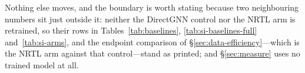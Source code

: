 Nothing else moves, and the boundary is worth stating because
two neighbouring numbers sit just outside it: neither the DirectGNN control nor the NRTL arm is
retrained, so their rows in Tables~\ref{tab:baselines}, \ref{tab:si-baselines-full}
and~\ref{tab:si-arms}, and the endpoint
comparison of \S\ref{sec:data-efficiency}---which is the NRTL arm against that control---stand as
printed; and \S\ref{sec:measure} uses no trained model at all.

